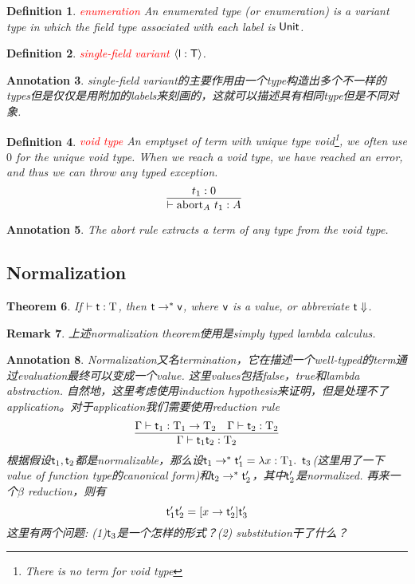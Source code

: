 \documentclass{article}
\theoremstyle{plain}
\newtheorem{theorem}{Theorem}
\newtheorem{definition}[theorem]{Definition}
\newtheorem{remark}[theorem]{Remark}
\newtheorem{annotation}[theorem]{Annotation}
\theoremstyle{nonumberplain}
\newcommand{\lam}[2]{\ensuremath{\lambda #1\ldotp~ #2}} %
\newcommand{\singletype}[1]{\text{#1}}
\newcommand{\termtype}[2]{\ensuremath{#1:#2}}
\newcommand{\term}[1]{\ensuremath\mathsf{#1}}
\newcommand{\redt}[1]{\textcolor{red}{#1}}
\begin{document}
\begin{definition}
\rm \redt{enumeration} An enumerated type (or enumeration) is a variant type in which the field type associated with each label is $\term{Unit}$.
\end{definition}

\begin{definition}
\rm \redt{single-field variant} $\left<\term{l}:\term{T} \right>$.
\end{definition}

\begin{annotation}
\rm single-field variant的主要作用由一个type构造出多个不一样的types但是仅仅是用附加的labels来刻画的，这就可以描述具有相同type但是不同对象.
\end{annotation}

\begin{definition}
\rm \redt{void type} An emptyset of term with unique type void\footnote{There is no term for void type}, we often use $0$ for the unique void type. When we reach a void type, we have reached an error, and thus we can throw any typed exception. 
$$
\infer[]{\vdash \text{abort}_A~t_1:A}{t_1:0}
$$  
\end{definition}

\begin{annotation}
\rm The abort rule extracts a term of any type from the void type. 
\end{annotation}

\newpage
\subsection{Normalization}

\begin{theorem}
\rm If $\vdash \term{t}:\singletype{T}$, then $\term{t} \to^* \term{v}$, where $\term{v}$ is a value, or abbreviate $\term{t}\Downarrow$. 
\end{theorem}

\begin{remark}
\rm 上述normalization theorem使用是simply typed lambda calculus. 
\end{remark}

\begin{annotation}
\rm Normalization又名termination，它在描述一个well-typed的term通过evaluation最终可以变成一个value. 这里values包括false，true和lambda abstraction. 自然地，这里考虑使用induction hypothesis来证明，但是处理不了application。对于application我们需要使用reduction rule
$$
\infer{\Gamma \vdash \termtype{\term{t}_1 \term{t}_2}{\singletype{T}_2}}{\Gamma	\vdash \termtype{\term{t}_1}{\singletype{T}_1 \to \singletype{T}_2 } & \Gamma \vdash \termtype{\term{t}_2}{\singletype{T}_2} }
$$
根据假设$\term{t}_1, \term{t}_2$都是normalizable，那么设$\term{t}_1 \to^* \term{t}_1' = \lam{\termtype{x}{\singletype{T}_1}}{\term{t}_3}$(这里用了一下value of function type的canonical form)和$\term{t}_2 \to^* \term{t}_2'$，其中$\term{t}_2'$是normalized. 再来一个$\beta$ reduction，则有
$$
\term{t}_1' \term{t}_2' = [x \to \term{t}_2']\term{t}_3'
$$
这里有两个问题: (1)$\term{t}_3$是一个怎样的形式？(2) substitution干了什么？  
\end{annotation}
\end{document}
